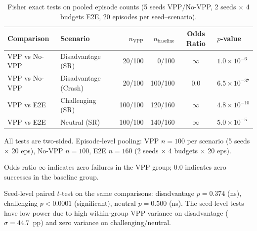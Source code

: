 \begin{table}[t]
\centering
\small
\caption{Fisher exact tests on pooled episode counts (5 seeds VPP/No-VPP, 2 seeds $\times$ 4 budgets E2E, 20 episodes per seed--scenario).}
\label{tab:fisher_tests}
\begin{tabular}{@{}llrrcl@{}}
\toprule
Comparison & Scenario & $n_{\text{VPP}}$ & $n_{\text{baseline}}$ & Odds Ratio & $p$-value \\
\midrule
VPP vs No-VPP & Disadvantage (SR)   & 20/100 & 0/100  & $\infty$ & $1.0 \times 10^{-6}$ \\
VPP vs No-VPP & Disadvantage (Crash) & 20/100 & 100/100 & 0.0     & $6.5 \times 10^{-37}$ \\
VPP vs E2E    & Challenging (SR)    & 100/100 & 120/160 & $\infty$ & $4.8 \times 10^{-10}$ \\
VPP vs E2E    & Neutral (SR)        & 100/100 & 140/160 & $\infty$ & $5.0 \times 10^{-5}$ \\
\bottomrule
\end{tabular}
\begin{tablenotes}
\small
\item All tests are two-sided. Episode-level pooling: VPP $n=100$ per scenario (5 seeds $\times$ 20 eps), No-VPP $n=100$, E2E $n=160$ (2 seeds $\times$ 4 budgets $\times$ 20 eps).
\item Odds ratio $\infty$ indicates zero failures in the VPP group; 0.0 indicates zero successes in the baseline group.
\item Seed-level paired $t$-test on the same comparisons: disadvantage $p=0.374$ (ns), challenging $p < 0.0001$ (significant), neutral $p=0.500$ (ns). The seed-level tests have low power due to high within-group VPP variance on disadvantage ($\sigma=44.7$~pp) and zero variance on challenging/neutral.
\end{tablenotes}
\end{table}
